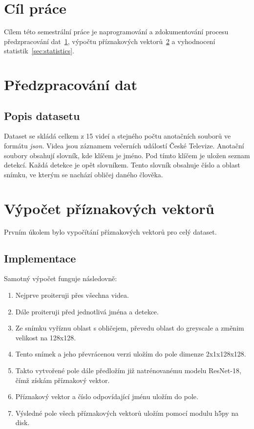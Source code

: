 \documentclass[11pt]{article}
\begin{document}
    \section*{Cíl práce}
    Cílem této semestrální práce je naprogramování a zdokumentování procesu předzpracování dat~\ref{sec:preprocessing},
    výpočtu příznakových vektorů~\ref{sec:features} a vyhodnocení statistik~\ref{sec:statistics}.


    \section{Předzpracování dat}\label{sec:preprocessing}

    \subsection{Popis datasetu}\label{subsec:dataset}
    Dataset se skládá celkem z 15 videí a stejného počtu anotačních souborů ve formátu \textit{json}.
    Videa jsou záznamem večerních událostí České Televize.
    Anotační soubory obsahují slovník, kde klíčem je jméno.
    Pod tímto klíčem je uložen seznam detekcí.
    Každá detekce je opět slovníkem.
    Tento slovník obsahuje číslo a oblast snímku, ve kterým se nachází obličej daného člověka.

    \section{Výpočet příznakových vektorů}\label{sec:features}
    Prvním úkolem bylo vypočítání příznakových vektorů pro celý dataset.

    \subsection{Implementace}\label{subsec:implementace}
    Samotný výpočet funguje následovně:
    \begin{enumerate}
        \item Nejprve proiteruji přes všechna videa.
        \item Dále proiteruji před jednotlivá jména a detekce.
        \item Ze snímku vyříznu oblast s obličejem, převedu oblast do greyscale a změnim velikost na 128x128.
        \item Tento snímek a jeho převrácenou verzi uložím do pole dimenze 2x1x128x128.
        \item Takto vytvořené pole dále předložím již natrénovanému modelu ResNet-18, čímž získám příznakový vektor.
        \item Příznakový vektor a číslo odpovídající jménu uložím do pole.
        \item Výsledné pole všech příznakových vektorů uložím pomocí modulu h5py na disk.
    \end{enumerate}
\end{document}
